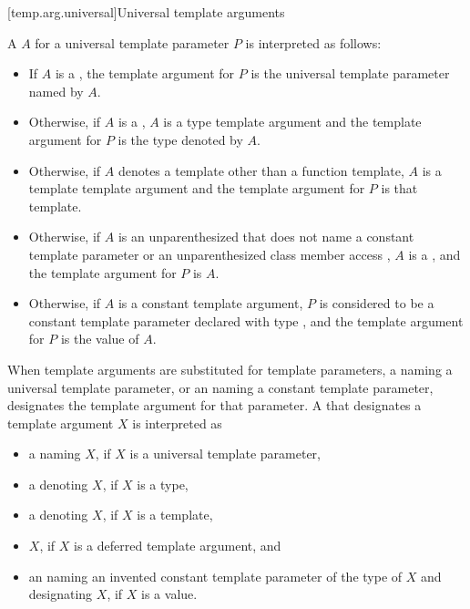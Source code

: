\documentclass{wg21}
\begin{document}
\begin{addedblock}
[temp.arg.universal]{Universal template arguments}


\pnum
A  $A$ for a universal template parameter $P$
is interpreted as follows:
\begin{itemize}
\item
If $A$ is a ,
the template argument for $P$ is the universal template parameter named by $A$.
\item
Otherwise, if $A$ is a ,
$A$ is a type template argument and
the template argument for $P$ is the type denoted by $A$.
\item
Otherwise, if $A$ denotes a template  other than a function template, $A$ is a template template argument and
the template argument for $P$ is that template.
\item
Otherwise, if $A$ is an unparenthesized  that does not name a constant template parameter
or an unparenthesized class member access ,
$A$ is a , and
the template argument for $P$ is $A$.
\item
Otherwise, if $A$ is a constant template argument,
$P$ is considered to be a constant template parameter
declared with type  , and
the template argument for $P$ is the value of $A$.
\end{itemize}


\pnum
When template arguments are substituted for template parameters,
a  naming a universal template parameter,
or an  naming a constant template parameter,
designates the template argument for that parameter.
A  that designates a template argument $X$
is interpreted as
\begin{itemize}
    \item
    a  naming $X$,
    if $X$ is a universal template parameter,
    \item
    a  denoting $X$, if $X$ is a type,
    \item
    a  denoting $X$, if $X$ is a template,
    \item
    $X$, %
    if $X$ is a deferred template argument, and
    \item
    an  naming an invented constant template parameter
    of the type of $X$ and designating $X$, if $X$ is a value.
\end{itemize}



\end{addedblock}
\end{document}
